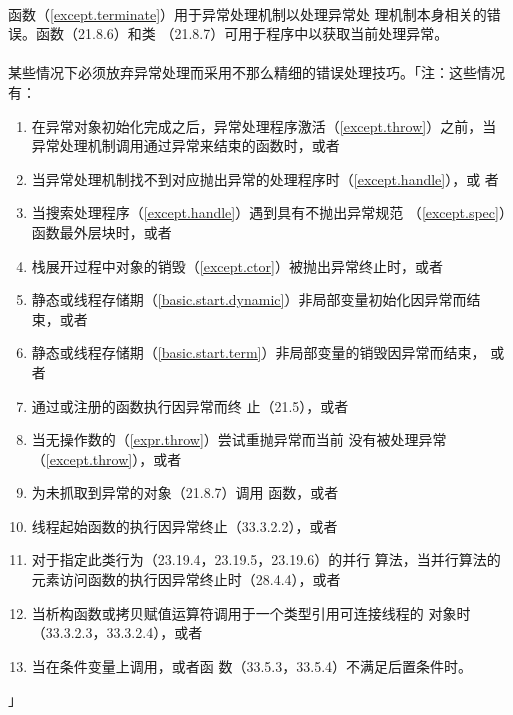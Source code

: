 \paragraph{}
函数（\ref{except.terminate}）用于异常处理机制以处理异常处
理机制本身相关的错误。函数（21.8.6）和类
（21.8.7）可用于程序中以获取当前处理异常。

\paragraph{}
某些情况下必须放弃异常处理而采用不那么精细的错误处理技巧。「注：这些情况有：
\begin{enumerate}
  \item{在异常对象初始化完成之后，异常处理程序激活（\ref{except.throw}）之前，当
    异常处理机制调用通过异常来结束的函数时，或者}
  \item{当异常处理机制找不到对应抛出异常的处理程序时（\ref{except.handle}），或
    者}
  \item{当搜索处理程序（\ref{except.handle}）遇到具有不抛出异常规范
    （\ref{except.spec}）函数最外层块时，或者}
  \item{栈展开过程中对象的销毁（\ref{except.ctor}）被抛出异常终止时，或者}
  \item{静态或线程存储期（\ref{basic.start.dynamic}）非局部变量初始化因异常而结
    束，或者}
  \item{静态或线程存储期（\ref{basic.start.term}）非局部变量的销毁因异常而结束，
    或者}
  \item{通过或注册的函数执行因异常而终
    止（21.5），或者}
  \item{当无操作数的（\ref{expr.throw}）尝试重抛异常而当前
    没有被处理异常（\ref{except.throw}），或者}
  \item{为未抓取到异常的对象（21.8.7）调用
    函数，或者}
  \item{线程起始函数的执行因异常终止（33.3.2.2），或者}
  \item{对于指定此类行为（23.19.4，23.19.5，23.19.6）的并行
    算法，当并行算法的元素访问函数的执行因异常终止时（28.4.4），或者}
  \item{当析构函数或拷贝赋值运算符调用于一个类型引用可连接线程的
    对象时（33.3.2.3，33.3.2.4），或者}
  \item{当在条件变量上调用，或者函
    数（33.5.3，33.5.4）不满足后置条件时。}
\end{enumerate}」

